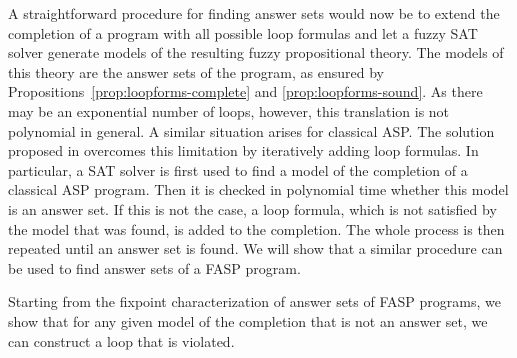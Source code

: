 \documentclass{tlp}
\begin{document}
A straightforward procedure for finding answer sets would now be to extend the completion of a program with all possible loop formulas and let a fuzzy SAT solver generate models of the resulting fuzzy propositional theory. The models of this theory are the answer sets of the program, as ensured by Propositions~\ref{prop:loopforms-complete} and \ref{prop:loopforms-sound}. As there may be an exponential number of loops, however, this translation is not polynomial in general. A similar situation arises for classical ASP. The solution proposed in \cite{assat-linzhao} overcomes this limitation by iteratively adding loop formulas. In particular, a SAT solver is first used to find a model of the completion of a classical ASP program. Then it is checked in polynomial time whether this model is an answer set. If this is not the case, a loop formula, which is not satisfied by the model that was found, is added to the completion. The whole process is then repeated until an answer set is found. We will show that a similar procedure can be used to find answer sets of a FASP program.  

Starting from the fixpoint characterization of answer sets of FASP programs, we show that for any given model of the completion that is not an answer set, we can construct a loop that is violated.
\end{document}
